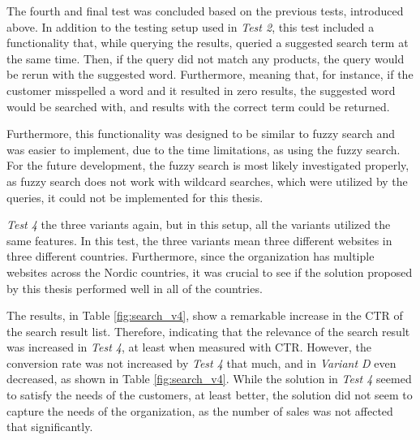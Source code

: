 
The fourth and final test was concluded based on the previous tests, introduced above.
In addition to the testing setup used in \emph{Test 2}, this test included a functionality that, while 
querying the results, queried a suggested search term at the same time.
Then, if the query did not match any products, the query would be rerun with the suggested word.
Furthermore, meaning that, for instance, if the customer misspelled a word and it resulted in zero results,
the suggested word would be searched with, and results with the correct term could be returned.


Furthermore, this functionality was designed to be similar to fuzzy search and was easier to implement,
due to the time limitations, as using the fuzzy search.
For the future development, the fuzzy search is most likely investigated properly, as fuzzy search does not 
work with wildcard searches, which were utilized by the queries, it could not be implemented for this thesis.

\emph{Test 4} the three variants again, but in this setup, all the variants utilized the same features.
In this test, the three variants mean three different websites in three different countries.
Furthermore, since the organization has multiple websites across the Nordic countries, it was crucial
to see if the solution proposed by this thesis performed well in all of the countries.


The results, in Table \ref{fig:search_v4}, show a remarkable increase in the CTR of the search result list.
Therefore, indicating that the relevance of the search result was increased in \emph{Test 4}, at least when
measured with CTR.
However, the conversion rate was not increased by \emph{Test 4} that much, and in \emph{Variant D} even decreased,
as shown in Table \ref{fig:search_v4}.
While the solution in \emph{Test 4} seemed to satisfy the needs of the customers, at least better, the solution did
not seem to capture the needs of the organization, as the number of sales was not affected that significantly.


